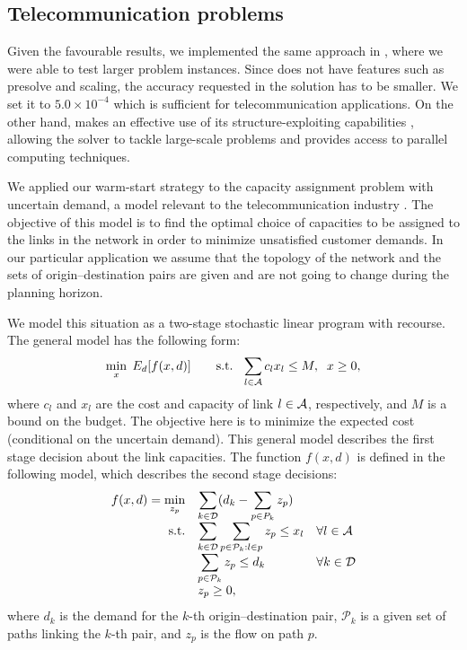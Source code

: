 %
%
\subsection{Telecommunication problems}

Given the favourable results, we implemented the same approach 
in \OOPS \cite{GondzioSarkissian,GondzioGrothey07}, where we were 
able to test larger problem instances. 
Since \OOPS does not have features such as presolve and scaling,
the accuracy requested in the solution has to be smaller. We set it to
$5.0 \times 10^{-4}$ which is sufficient for telecommunication
applications.
On the other hand, \OOPS makes an effective use of its structure-exploiting
capabilities \cite{GondzioSarkissian,GondzioGrothey07},
allowing the solver to tackle large-scale problems 
and provides access to parallel computing techniques.

We applied our warm-start strategy to the capacity assignment problem 
with uncertain demand, a model relevant to the telecommunication 
industry \cite{Ouorou}. The objective of this model is to find 
the optimal choice of capacities to be assigned to the links 
in the network in order to minimize unsatisfied customer demands.
In our particular application we assume that the topology 
of the network and the sets of origin--destination pairs are given 
and are not going to change during the planning horizon.

We model this situation as a two-stage stochastic linear program 
with recourse. The general model has the following form:
\[
  \min_x \; E_d [f(x,d)] \qquad 
  \mbox{s.t. }\; \sum_{l \in {\cal A}} c_l x_l \le M, \;\;  x \ge 0,
\]
where $c_l$ and $x_l$ are the cost and capacity of link $l \in {\cal A}$, 
respectively, and $M$ is a bound on the budget. The objective 
here is to minimize the expected cost (conditional on the uncertain 
demand). This general model describes the first stage 
decision about the link capacities.
The function $f(x,d)$ is defined in the following model, which 
describes the second stage decisions:
\[
\begin{array}{rll}
  f(x,d) = \displaystyle\min_{z_p}
               & \displaystyle\sum_{k\in {\cal D}} (d_k -\sum_{p\in P_k} z_p)\\
  \mbox{s.t.}  & \displaystyle\sum_{k\in {\cal D}} \sum_{p\in {\cal P}_k: l\in p} z_p \le x_l
                                        & \forall l \in {\cal A} \\
               & \displaystyle\sum_{p\in {\cal P}_k} z_p \le d_k
                                        & \forall k \in {\cal D} \\
               & z_p \ge0,
\end{array}
\]
where $d_k$ is the demand for the $k$-th origin--destination pair, 
$\mathcal{P}_k$ is a given set of paths linking the $k$-th pair, and $z_p$ 
is the flow on path $p$.

